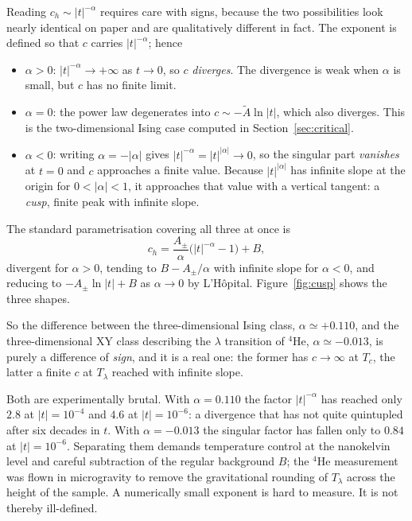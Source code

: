 \documentclass[10pt,a4paper]{article}
\theoremstyle{remark}
\begin{document}
Reading $c_{h}\sim|t|^{-\alpha}$ requires care with signs, because the two
possibilities look nearly identical on paper and are qualitatively different in
fact. The exponent is defined so that $c$ carries $|t|^{-\alpha}$; hence
\begin{itemize}
\item $\alpha>0$: $|t|^{-\alpha}\to+\infty$ as $t\to0$, so $c$ \emph{diverges}.
The divergence is weak when $\alpha$ is small, but $c$ has no finite limit.
\item $\alpha=0$: the power law degenerates into $c\sim-\tilde A\ln|t|$, which
also diverges. This is the two-dimensional Ising case computed in
Section~\ref{sec:critical}.
\item $\alpha<0$: writing $\alpha=-|\alpha|$ gives
$|t|^{-\alpha}=|t|^{|\alpha|}\to0$, so the singular part \emph{vanishes} at $t=0$
and $c$ approaches a finite value. Because $|t|^{|\alpha|}$ has infinite slope at
the origin for $0<|\alpha|<1$, it approaches that value with a vertical tangent:
a \emph{cusp}, finite peak with infinite slope.
\end{itemize}
The standard parametrisation covering all three at once is
\[
c_{h}=\frac{A_{\pm}}{\alpha}\Big(|t|^{-\alpha}-1\Big)+B ,
\]
divergent for $\alpha>0$, tending to $B-A_{\pm}/\alpha$ with infinite slope for
$\alpha<0$, and reducing to $-A_{\pm}\ln|t|+B$ as $\alpha\to0$ by L'H\^opital.
Figure~\ref{fig:cusp} shows the three shapes.

So the difference between the three-dimensional Ising class,
$\alpha\simeq+0.110$, and the three-dimensional XY class describing the
$\lambda$ transition of ${}^{4}$He, $\alpha\simeq-0.013$, is purely a difference
of \emph{sign}, and it is a real one: the former has $c\to\infty$ at $T_c$, the
latter a finite $c$ at $T_\lambda$ reached with infinite slope.

Both are experimentally brutal. With $\alpha=0.110$ the factor $|t|^{-\alpha}$
has reached only $2.8$ at $|t|=10^{-4}$ and $4.6$ at $|t|=10^{-6}$: a divergence
that has not quite quintupled after six decades in $t$. With $\alpha=-0.013$ the
singular factor has fallen only to $0.84$ at $|t|=10^{-6}$. Separating them
demands temperature control at the nanokelvin level and careful subtraction of the
regular background $B$; the ${}^{4}$He measurement was flown in microgravity to
remove the gravitational rounding of $T_\lambda$ across the height of the sample.
A numerically small exponent is hard to measure. It is not thereby ill-defined.
\end{document}

